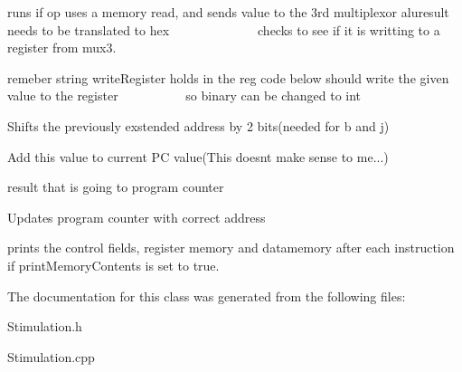 runs if op uses a memory read, and sends value to the 3rd multiplexor aluresult needs to be translated to hex ~\newline
~\newline
~\newline
~\newline
~\newline
~\newline
~\newline
~\newline
 checks to see if it is writting to a register from mux3.

remeber string write\+Register holds in the reg code below should write the given value to the register ~\newline
~\newline
~\newline
~\newline
~\newline
~\newline
 so binary can be changed to int

Shifts the previously exstended address by 2 bits(needed for b and j)

Add this value to current PC value(This doesnt make sense to me...)

result that is going to program counter

Updates program counter with correct address

prints the control fields, register memory and datamemory after each instruction if print\+Memory\+Contents is set to true. 

The documentation for this class was generated from the following files\+:\begin{DoxyCompactItemize}
\item 
Stimulation.\+h\item 
Stimulation.\+cpp\end{DoxyCompactItemize}
